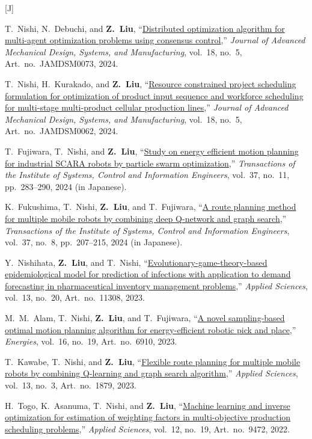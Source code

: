 \documentclass[11pt,a4paper]{article}
\newcommand{\doititle}[2]{\href{https://doi.org/#1}{#2}}
\newlength{\datecol}
\newcounter{pubno}
\newenvironment{publist}[1]{%
  \begin{list}{[#1\arabic{pubno}]}{%
    \usecounter{pubno}%
    \setlength{\leftmargin}{\datecol}%
    \setlength{\labelwidth}{\datecol}%
    \setlength{\labelsep}{0pt}%
    \setlength{\itemsep}{3pt}%
    \setlength{\parsep}{0pt}%
    \setlength{\topsep}{2pt}%
    \renewcommand{\makelabel}[1]{##1\hfil}}}%
  {\end{list}}
\begin{document}
\begin{publist}{J}
\item T.~Nishi, N.~Debuchi, and \textbf{Z.~Liu}, ``\doititle{10.1299/jamdsm.2024jamdsm0073}{Distributed optimization algorithm for multi-agent optimization problems using consensus control},'' \textit{Journal of Advanced Mechanical Design, Systems, and Manufacturing}, vol.~18, no.~5, Art.~no.~JAMDSM0073, 2024.
\item T.~Nishi, H.~Kurakado, and \textbf{Z.~Liu}, ``\doititle{10.1299/jamdsm.2024jamdsm0062}{Resource constrained project scheduling formulation for optimization of product input sequence and workforce scheduling for multi-stage multi-product cellular production lines},'' \textit{Journal of Advanced Mechanical Design, Systems, and Manufacturing}, vol.~18, no.~5, Art.~no.~JAMDSM0062, 2024.
\item T.~Fujiwara, T.~Nishi, and \textbf{Z.~Liu}, ``\doititle{10.5687/iscie.37.283}{Study on energy efficient motion planning for industrial SCARA robots by particle swarm optimization},'' \textit{Transactions of the Institute of Systems, Control and Information Engineers}, vol.~37, no.~11, pp.~283--290, 2024 (in Japanese).
\item K.~Fukushima, T.~Nishi, \textbf{Z.~Liu}, and T.~Fujiwara, ``\doititle{10.5687/iscie.37.207}{A route planning method for multiple mobile robots by combining deep {Q}-network and graph search},'' \textit{Transactions of the Institute of Systems, Control and Information Engineers}, vol.~37, no.~8, pp.~207--215, 2024 (in Japanese).
\item Y.~Nishihata, \textbf{Z.~Liu}, and T.~Nishi, ``\doititle{10.3390/app132011308}{Evolutionary-game-theory-based epidemiological model for prediction of infections with application to demand forecasting in pharmaceutical inventory management problems},'' \textit{Applied Sciences}, vol.~13, no.~20, Art.~no.~11308, 2023.
\item M.~M.~Alam, T.~Nishi, \textbf{Z.~Liu}, and T.~Fujiwara, ``\doititle{10.3390/en16196910}{A novel sampling-based optimal motion planning algorithm for energy-efficient robotic pick and place},'' \textit{Energies}, vol.~16, no.~19, Art.~no.~6910, 2023.
\item T.~Kawabe, T.~Nishi, and \textbf{Z.~Liu}, ``\doititle{10.3390/app13031879}{Flexible route planning for multiple mobile robots by combining Q-learning and graph search algorithm},'' \textit{Applied Sciences}, vol.~13, no.~3, Art.~no.~1879, 2023.
\item H.~Togo, K.~Asanuma, T.~Nishi, and \textbf{Z.~Liu}, ``\doititle{10.3390/app12199472}{Machine learning and inverse optimization for estimation of weighting factors in multi-objective production scheduling problems},'' \textit{Applied Sciences}, vol.~12, no.~19, Art.~no.~9472, 2022.

\end{publist}
\end{document}

